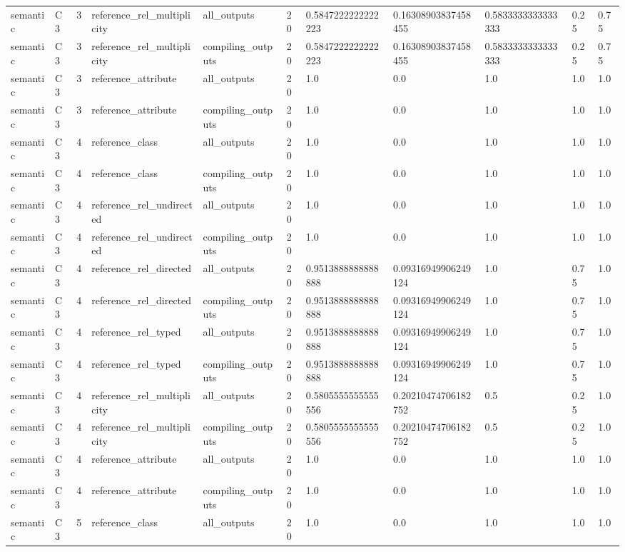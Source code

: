 \begin{tabular}{lllllllllll}
semantic & C3 & 3 & reference\_rel\_multiplicity & all\_outputs & 20 & 0.5847222222222223 & 0.16308903837458455 & 0.5833333333333333 & 0.25 & 0.75 \\
semantic & C3 & 3 & reference\_rel\_multiplicity & compiling\_outputs & 20 & 0.5847222222222223 & 0.16308903837458455 & 0.5833333333333333 & 0.25 & 0.75 \\
semantic & C3 & 3 & reference\_attribute & all\_outputs & 20 & 1.0 & 0.0 & 1.0 & 1.0 & 1.0 \\
semantic & C3 & 3 & reference\_attribute & compiling\_outputs & 20 & 1.0 & 0.0 & 1.0 & 1.0 & 1.0 \\
semantic & C3 & 4 & reference\_class & all\_outputs & 20 & 1.0 & 0.0 & 1.0 & 1.0 & 1.0 \\
semantic & C3 & 4 & reference\_class & compiling\_outputs & 20 & 1.0 & 0.0 & 1.0 & 1.0 & 1.0 \\
semantic & C3 & 4 & reference\_rel\_undirected & all\_outputs & 20 & 1.0 & 0.0 & 1.0 & 1.0 & 1.0 \\
semantic & C3 & 4 & reference\_rel\_undirected & compiling\_outputs & 20 & 1.0 & 0.0 & 1.0 & 1.0 & 1.0 \\
semantic & C3 & 4 & reference\_rel\_directed & all\_outputs & 20 & 0.9513888888888888 & 0.09316949906249124 & 1.0 & 0.75 & 1.0 \\
semantic & C3 & 4 & reference\_rel\_directed & compiling\_outputs & 20 & 0.9513888888888888 & 0.09316949906249124 & 1.0 & 0.75 & 1.0 \\
semantic & C3 & 4 & reference\_rel\_typed & all\_outputs & 20 & 0.9513888888888888 & 0.09316949906249124 & 1.0 & 0.75 & 1.0 \\
semantic & C3 & 4 & reference\_rel\_typed & compiling\_outputs & 20 & 0.9513888888888888 & 0.09316949906249124 & 1.0 & 0.75 & 1.0 \\
semantic & C3 & 4 & reference\_rel\_multiplicity & all\_outputs & 20 & 0.5805555555555556 & 0.20210474706182752 & 0.5 & 0.25 & 1.0 \\
semantic & C3 & 4 & reference\_rel\_multiplicity & compiling\_outputs & 20 & 0.5805555555555556 & 0.20210474706182752 & 0.5 & 0.25 & 1.0 \\
semantic & C3 & 4 & reference\_attribute & all\_outputs & 20 & 1.0 & 0.0 & 1.0 & 1.0 & 1.0 \\
semantic & C3 & 4 & reference\_attribute & compiling\_outputs & 20 & 1.0 & 0.0 & 1.0 & 1.0 & 1.0 \\
semantic & C3 & 5 & reference\_class & all\_outputs & 20 & 1.0 & 0.0 & 1.0 & 1.0 & 1.0 \\

\end{tabular}
